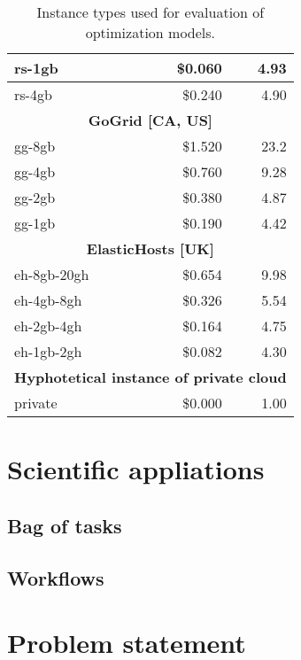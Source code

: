 \begin{table}
\begin{tabular}{| l | r | r |}
    rs-1gb            & \$0.060   & 4.93                                     \\ \hline
    rs-4gb            & \$0.240   & 4.90                                     \\ \hline
    \multicolumn{3}{|c|}{\textbf{GoGrid [CA, US]}}                           \\ \hline
    gg-8gb            & \$1.520   & 23.2                                     \\ \hline
    gg-4gb            & \$0.760   & 9.28                                     \\ \hline
    gg-2gb            & \$0.380   & 4.87                                     \\ \hline
    gg-1gb            & \$0.190   & 4.42                                     \\ \hline
    \multicolumn{3}{|c|}{\textbf{ElasticHosts [UK]}}                         \\ \hline
    eh-8gb-20gh       & \$0.654   & 9.98                                     \\ \hline
    eh-4gb-8gh        & \$0.326   & 5.54                                     \\ \hline
    eh-2gb-4gh        & \$0.164   & 4.75                                     \\ \hline
    eh-1gb-2gh        & \$0.082   & 4.30                                     \\ \hline
    \multicolumn{3}{|c|}{\textbf{Hyphotetical instance of private cloud}}    \\ \hline
    private           & \$0.000   & 1.00                                     \\ \hline
  \end{tabular}
  \caption{Instance types used for evaluation of optimization models.}
  \label{table:intro:cloud:pricing}  
\end{table}




\section{Scientific appliations}

\subsection{Bag of tasks}

\subsection{Workflows}

\section{Problem statement}

